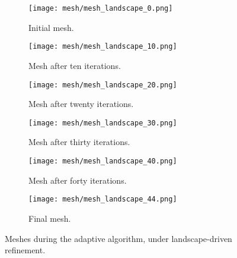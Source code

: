 \documentclass[12pt]{amsart}
\begin{document}
\begin{figure}[htbp]
    \begin{subfigure}[t]{0.49\textwidth}
        \centering
        \texttt{[image: mesh/mesh\_landscape\_0.png]}
        \caption{Initial mesh.}
        \label{fig:mesh_0}
    \end{subfigure}
    \begin{subfigure}[t]{0.49\textwidth}
        \centering
        \texttt{[image: mesh/mesh\_landscape\_10.png]}
        \caption{Mesh after ten iterations.}
        \label{fig:mesh_10}
    \end{subfigure}
    \vspace{1cm}
    \begin{subfigure}[t]{0.49\textwidth}
        \centering
        \texttt{[image: mesh/mesh\_landscape\_20.png]}
        \caption{Mesh after twenty iterations.}
        \label{fig:mesh_20}
    \end{subfigure}
    \begin{subfigure}[t]{0.49\textwidth}
        \centering
        \texttt{[image: mesh/mesh\_landscape\_30.png]}
        \caption{Mesh after thirty iterations.}
        \label{fig:mesh_30}
    \end{subfigure}
    \vspace{1cm}
    \begin{subfigure}[t]{0.49\textwidth}
        \centering
        \texttt{[image: mesh/mesh\_landscape\_40.png]}
        \caption{Mesh after forty iterations.}
        \label{fig:mesh_40}
    \end{subfigure}
    \begin{subfigure}[t]{0.49\textwidth}
        \centering
        \texttt{[image: mesh/mesh\_landscape\_44.png]}
        \caption{Final mesh.}
        \label{fig:mesh_50}
    \end{subfigure}
    \caption{Meshes during the adaptive algorithm, under landscape-driven refinement.}
\end{figure}
\end{document}
